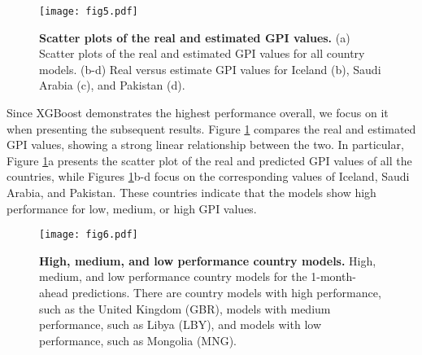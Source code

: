 \documentclass{bmcart}
\begin{document}

\begin{figure}[htp]
\centering
\texttt{[image: fig5.pdf]}
\caption{\textbf{Scatter plots of the real and estimated GPI values.} (a) Scatter plots of the real and estimated GPI values for all country models.
(b-d) Real versus estimate GPI values for Iceland (b), Saudi Arabia (c), and Pakistan (d).}
\label{fig:scatter_preds}
\end{figure}

Since XGBoost demonstrates the highest performance overall, we focus on it when presenting the subsequent results.
Figure \ref{fig:scatter_preds} compares the real and estimated GPI values, showing a strong linear relationship between the two. 
In particular, Figure \ref{fig:scatter_preds}a presents the scatter plot of the real and predicted GPI values of all the countries, while Figures \ref{fig:scatter_preds}b-d focus on the corresponding values of Iceland, Saudi Arabia, and Pakistan. 
These countries indicate that the models show high performance for low, medium, or high GPI values.

\begin{figure}[htp]
\centering
\texttt{[image: fig6.pdf]}
\caption{\textbf{High, medium, and low performance country models.} High, medium, and low performance country models for the 1-month-ahead predictions. There are country models with high performance, such as the United Kingdom (GBR), models with medium performance, such as Libya (LBY), and models with low performance, such as Mongolia (MNG).}
\label{fig:scatterplot}
\end{figure}
\end{document}
